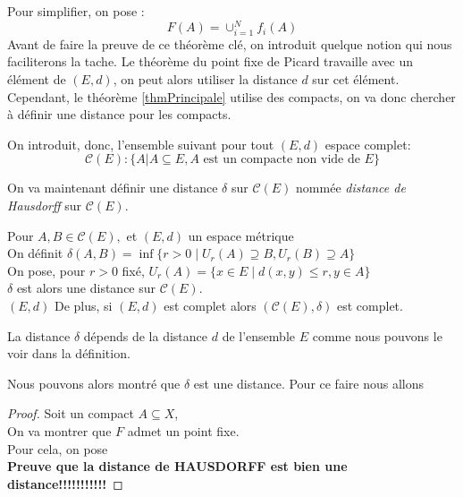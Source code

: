 \documentclass[a4paper, 12pt]{report}
\begin{document}
			Pour simplifier, on pose :
			\begin{equation*}
				F(A)=\cup^N_{i=1}f_i(A)
			\end{equation*}
			\hspace{.7 cm} Avant de faire la preuve de ce théorème clé, on introduit quelque notion qui nous faciliterons la tache. Le théorème du point fixe de Picard travaille avec un élément de $(E,d)$, on peut alors utiliser la distance $d$ sur cet élément. Cependant, le théorème \ref{thmPrincipale} utilise des compacts, on va donc chercher à définir une distance pour les compacts.
			
			On introduit, donc, l'ensemble suivant pour tout $(E,d)$ espace complet:
			\begin{equation*}
				\mathcal{C}(E) : \{A|A\subseteq E, A\textrm{ est un compacte non vide de }E\}
			\end{equation*}
			
			\hspace{.7 cm}On va maintenant définir une distance $\delta$ sur $\mathcal{C}(E)$ nommée \textit{distance de Hausdorff} sur $\mathcal{C}(E)$.
			\begin{prop}
				\label{mesHauss}
				Pour $A,B\in\mathcal{C}(E),$ et $(E,d)$ un espace métrique\\
				On définit $\delta(A,B)=\inf\{r>0\mid U_r(A)\supseteq B, U_r(B)\supseteq A\}$\\
				On pose, pour $r>0$ fixé, $U_r(A)=\{x\in E\mid d(x,y)\leq r,y\in A\}$\\
				$\delta$ est alors une distance sur $\mathcal{C}(E)$.\\$(E,d)$
				De plus, si $(E,d)$ est complet alors $(\mathcal{C}(E),\delta)$ est complet.
			\end{prop}
			\begin{remark*}
				La distance $\delta$ dépends de la distance $d$ de l'ensemble $E$ comme nous pouvons le voir dans la définition. 
			\end{remark*}

			
			\hspace{.7 cm}Nous pouvons alors montré que $\delta$ est une distance. Pour ce faire nous allons 
			\begin{proof}
				Soit un compact $A\subseteq X$,\\
				On va montrer que $F$ admet un point fixe.\\
				Pour cela, on pose \\
				\textbf{Preuve que la distance de HAUSDORFF est bien une distance!!!!!!!!!!!}
			\end{proof}
			
\end{document}
